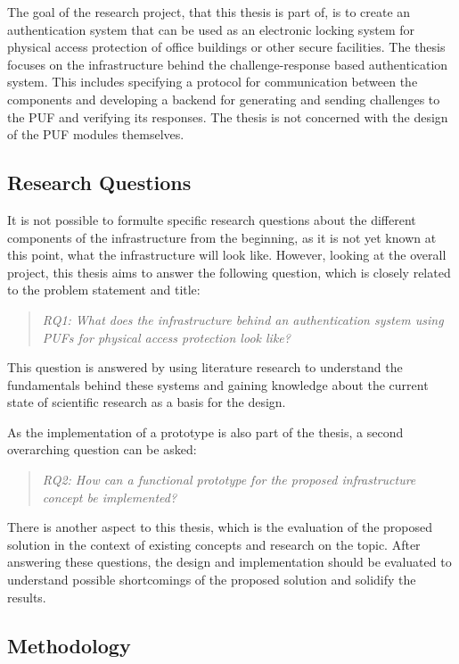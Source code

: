 The goal of the research project, that this thesis is part of, is to create an authentication system that can be used as an
electronic locking system for physical access protection of office buildings or other secure facilities.
The thesis focuses on the infrastructure behind the challenge-response based authentication system.
This includes specifying a protocol for communication between the components and developing a backend for generating
and sending challenges to the \ac{PUF} and verifying its responses.
The thesis is not concerned with the design of the \ac{PUF} modules themselves.

\subsection{Research Questions}
\label{sec:research_questions}

It is not possible to formulte specific research questions about the different components of the infrastructure from the beginning,
as it is not yet known at this point, what the infrastructure will look like.
However, looking at the overall project, this thesis aims to answer the following question, which is closely
related to the problem statement and title:

\begin{quote}
      \emph{RQ1: What does the infrastructure behind an authentication system using \acp{PUF} for physical access protection look like?}
\end{quote}

This question is answered by using literature research to understand the fundamentals behind these systems and
gaining knowledge about the current state of scientific research as a basis for the design.

As the implementation of a prototype is also part of the thesis, a second overarching question can be asked:

\begin{quote}
      \emph{RQ2: How can a functional prototype for the proposed infrastructure concept be implemented?}
\end{quote}

There is another aspect to this thesis, which is the evaluation of the proposed solution in the context of
existing concepts and research on the topic.
After answering these questions, the design and implementation should be evaluated to understand possible shortcomings
of the proposed solution and solidify the results.

\subsection{Methodology}
\label{sec:methodology}

